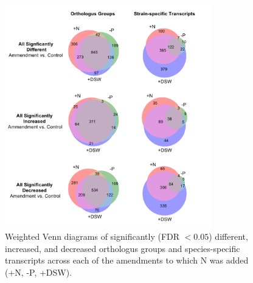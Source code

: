 \begin{figure}[p!]
  \centering
    \includegraphics[width=0.8\textwidth]{Images/C6_FigureS5_Venn_DEGenes.pdf}
    \caption[Weighted Venn diagrams of significantly different, increased, and decreased orthologus groups and species-specific transcripts across each of the amendedments to which N was added. ]{Weighted Venn diagrams of significantly (FDR $< 0.05$) different, increased, and decreased orthologus groups and species-specific transcripts across each of the amendments to which N was added (+N, -P, +DSW).}
    \label{fig:a5f5}
\end{figure}



